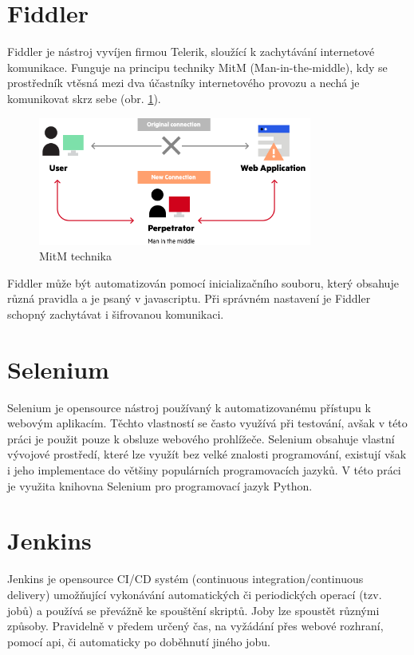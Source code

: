 \documentclass[thesis=M,czech,hidelinks]{FITthesis}[2013/05/06]
\begin{document}
\section{Fiddler}\label{sec:fiddler}
Fiddler \cite{fiddler} je nástroj vyvíjen firmou Telerik, sloužící k zachytávání internetové komunikace. Funguje na principu techniky MitM (Man-in-the-middle), kdy se prostředník vtěsná mezi dva účastníky internetového provozu a nechá je komunikovat skrz sebe (obr. \ref{fig:mitm}).
\begin{figure}[h]
	\centering
	\includegraphics[width=9cm]{pictures/mitm.png}
	\caption{MitM technika \cite{mitm}}
	\label{fig:mitm}
\end{figure}
Fiddler může být automatizován pomocí inicializačního souboru, který obsahuje různá pravidla a je psaný v javascriptu. Při správném nastavení je Fiddler schopný zachytávat i šifrovanou komunikaci.

\section{Selenium} \label{sec:selenium}
Selenium \cite{selenium} je opensource nástroj používaný k automatizovanému přístupu k webovým aplikacím. Těchto vlastností se často využívá při testování, avšak v této práci je použit pouze k obsluze webového prohlížeče. Selenium obsahuje vlastní vývojové prostředí, které lze využít bez velké znalosti programování, existují však i jeho implementace do většiny populárních programovacích jazyků. V této práci je využita knihovna Selenium pro programovací jazyk Python.


\section{Jenkins} \label{sec:jenkins}
Jenkins \cite{jenkins} je opensource CI/CD systém (continuous integration/continuous delivery) umožňující vykonávání automatických či periodických operací (tzv. jobů) a používá se převážně ke spouštění skriptů. Joby lze spoustět různými způsoby. Pravidelně v předem určený čas, na vyžádání přes webové rozhraní, pomocí api, či automaticky po doběhnutí jiného jobu.
\end{document}
